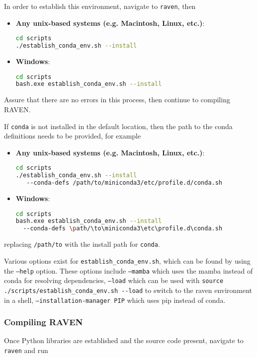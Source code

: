 In order to establish this environment, navigate to \texttt{raven}, then
\begin{itemize}

  \item \textbf{Any unix-based systems (e.g. Macintosh, Linux, etc.)}:
\begin{lstlisting}[language=bash]
cd scripts
./establish_conda_env.sh --install
\end{lstlisting}
  \item \textbf{Windows}:
  \begin{lstlisting}[language=bash]
cd scripts
bash.exe establish_conda_env.sh --install
\end{lstlisting}
  
\end{itemize}
Assure that there are no errors in this process, then continue to compiling RAVEN.

\nb If \texttt{conda} is not installed in the default location, then the path to the conda definitions
needs to be provided, for example

\begin{itemize}

  \item \textbf{Any unix-based systems (e.g. Macintosh, Linux, etc.)}:
\begin{lstlisting}[language=bash]
cd scripts
./establish_conda_env.sh --install
   --conda-defs /path/to/miniconda3/etc/profile.d/conda.sh
\end{lstlisting}
  \item \textbf{Windows}:
  \begin{lstlisting}[language=bash]
cd scripts
bash.exe establish_conda_env.sh --install
  --conda-defs \path/\to\miniconda3\etc\profile.d\conda.sh
\end{lstlisting}
  
\end{itemize}

replacing \texttt{/path/to} with the install path for \texttt{conda}.

\nb Various options exist for \texttt{establish\_conda\_env.sh}, which
can be found by using the \texttt{--help} option.  These options
include \texttt{--mamba} which uses the mamba instead of conda for
resolving dependencies, \texttt{--load} which can be used with
\verb'source ./scripts/establish_conda_env.sh --load' to switch to the
raven environment in a shell, \texttt{--installation-manager PIP} which
uses pip instead of conda.

\subsubsection{Compiling RAVEN}
Once Python libraries are established and the source code present, navigate to \texttt{raven} and run



